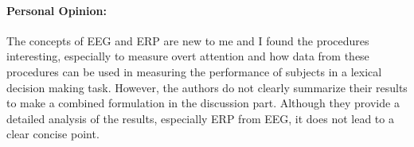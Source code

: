 \documentclass[12pt]{report}
\begin{document}
\paragraph{Personal Opinion:} 
The concepts of EEG and ERP are new to me and I found the procedures interesting, especially to measure overt attention and how data from these procedures can be used in measuring the performance of subjects in a lexical decision making task. However, the authors do not clearly summarize their results to make a combined formulation in the discussion part. Although they provide a detailed analysis of the results, especially ERP from EEG, it does not lead to a clear concise point.
\vfill
\end{document}
